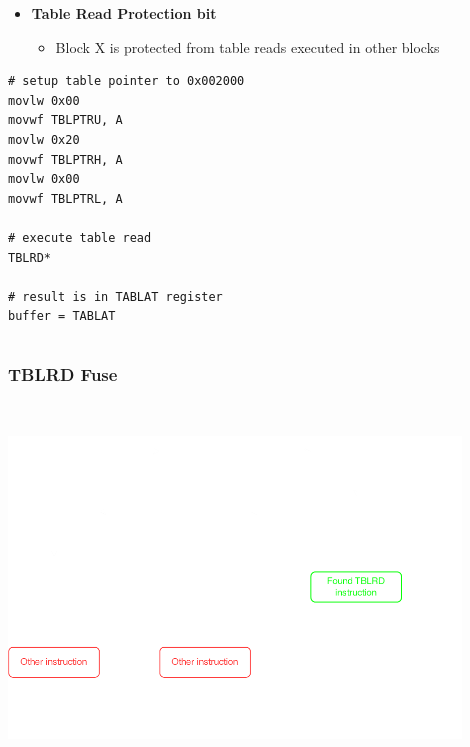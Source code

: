 \documentclass[aspectratio=169]{beamer}
\begin{document}
\begin{frame}[fragile]
\begin{columns}
\begin{column}{0.8\textwidth}
		\begin{itemize}
			\item \textbf{Table Read Protection bit}
				\begin{itemize}
					\item Block X is protected from table reads executed in other blocks
				\end{itemize}
		\end{itemize}

\begin{scriptsize}
\begin{lstlisting}[frame=single]
# setup table pointer to 0x002000
movlw 0x00
movwf TBLPTRU, A
movlw 0x20
movwf TBLPTRH, A
movlw 0x00
movwf TBLPTRL, A

# execute table read
TBLRD*

# result is in TABLAT register
buffer = TABLAT
\end{lstlisting}
\end{scriptsize}

		\end{column}
	\end{columns}

\end{frame}

\begin{frame}
	\frametitle{TBLRD Fuse}

	~\\

	\begin{center}
		\includegraphics[width=0.9\textwidth]{flowchart-tblrd-search.pdf}
	\end{center}
\end{frame}
\end{document}
